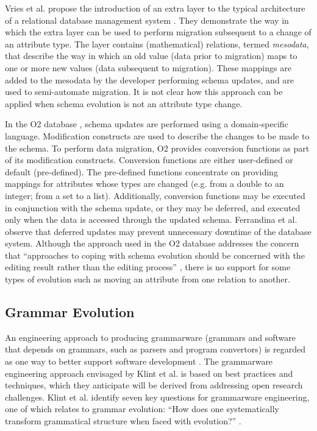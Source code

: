 Vries et al. propose the introduction of an extra layer to the typical architecture of a relational database management system \cite{vries04facilitating}. They demonstrate the way in which the extra layer can be used to perform migration subsequent to a change of an attribute type. The layer contains (mathematical) relations, termed \textit{mesodata}, that describe the way in which an old value (data prior to migration) maps to one or more new values (data subsequent to migration). These mappings are added to the mesodata by the developer performing schema updates, and are used to semi-automate migration. It is not clear how this approach can be applied when schema evolution is not an attribute type change.

In the O2 database \cite{ferrandina95schema}, schema updates are performed using a domain-specific language. Modification constructs are used to describe the changes to be made to the schema. To perform data migration, O2 provides conversion functions as part of its modification constructs. Conversion functions are either user-defined or default (pre-defined). The pre-defined functions concentrate on providing mappings for attributes whose types are changed (e.g. from a double to an integer; from a set to a list). Additionally, conversion functions may be executed in conjunction with the schema update, or they may be deferred, and executed only when the data is accessed through the updated schema. Ferrandina et al. observe that deferred updates may prevent unnecessary downtime of the database system. Although the approach used in the O2 database addresses the concern that ``approaches to coping with schema evolution should be concerned with the editing result rather than the editing process'' \cite{lerner00model}, there is no support for some types of evolution such as moving an attribute from one relation to another.


\subsection{Grammar Evolution}
\label{subsec:grammar_evolution}
An \cc engineering approach to producing grammarware (grammars and software that depends on grammars, such as parsers and program convertors) is regarded as one way to better support software development \cite{klint03grammarware}. The grammarware engineering approach envisaged by Klint et al. is based on best practices and techniques, which they anticipate will be derived from addressing open research challenges. Klint et al. identify seven key questions for grammarware engineering, one of which relates to grammar evolution: ``How does one systematically transform grammatical structure when faced with evolution?'' \cite[pg. 334]{klint03grammarware}.

